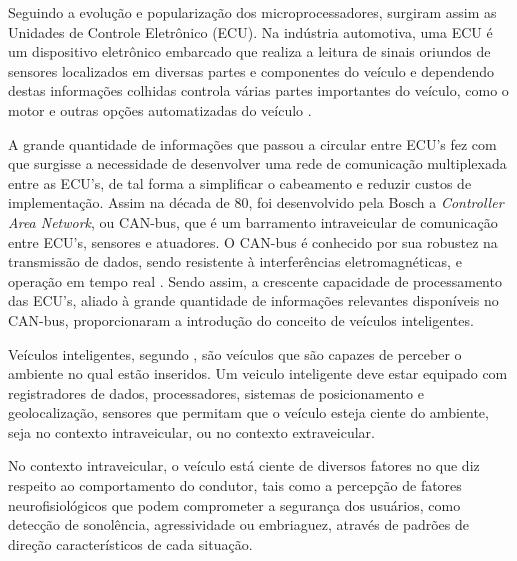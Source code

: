 
Seguindo a evolução e popularização dos microprocessadores, surgiram assim as Unidades de Controle Eletrônico (ECU). Na indústria automotiva, uma ECU é um dispositivo eletrônico embarcado que realiza a leitura de sinais oriundos de sensores localizados em diversas partes e componentes do veículo e dependendo destas informações colhidas controla várias partes importantes do veículo, como o motor e outras opções automatizadas do veículo \cite{Ebert2009}.

A grande quantidade de informações que passou a circular entre ECU's fez com que surgisse a necessidade de desenvolver uma rede de comunicação multiplexada entre as ECU's, de tal forma a simplificar o cabeamento e reduzir custos de implementação. Assim na década de 80, foi desenvolvido pela Bosch a \textit{Controller Area Network}, ou CAN-bus, que é um barramento intraveicular de comunicação entre ECU's, sensores e atuadores. O CAN-bus é conhecido por sua robustez na transmissão de dados, sendo resistente à interferências eletromagnéticas, e operação em tempo real \cite{Tuohy2014b}. Sendo assim, a crescente capacidade de processamento das ECU's, aliado à grande quantidade de informações relevantes disponíveis no CAN-bus, proporcionaram a introdução do conceito de veículos inteligentes.

Veículos inteligentes, segundo , são veículos que são capazes de perceber o ambiente no qual estão inseridos. Um veiculo inteligente deve estar equipado com registradores de dados, processadores, sistemas de posicionamento e geolocalização,  sensores que permitam que o veículo esteja ciente do ambiente, seja no contexto intraveicular, ou no contexto extraveicular. 

No contexto intraveicular, o veículo está ciente de diversos fatores no que diz respeito ao comportamento do condutor, tais como a percepção de fatores neurofisiológicos que podem comprometer a segurança dos usuários, como detecção de sonolência, agressividade ou embriaguez, através de padrões de direção característicos de cada situação. 

